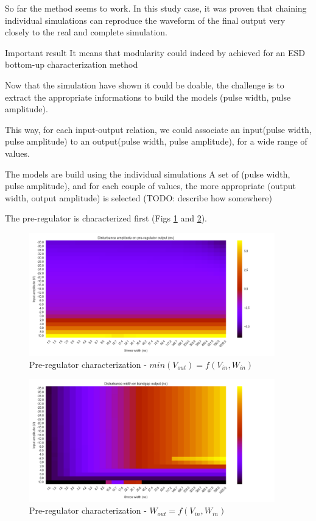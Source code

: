 So far the method seems to work.
In this study case, it was proven that chaining individual simulations can reproduce the waveform of the final output very closely to the real and complete simulation.

Important result
It means that modularity could indeed by achieved for an ESD bottom-up characterization method

Now that the simulation have shown it could be doable, the challenge is to extract the appropriate informations to build the models
(pulse width, pulse amplitude).

This way, for each input-output relation, we could associate an input(pulse width, pulse amplitude) to an output(pulse width, pulse amplitude), for a wide range of values.

The models are build using the individual simulations
A set of (pulse width, pulse amplitude), and for each couple of values, the more appropriate (output width, output amplitude) is selected (TODO: describe how somewhere)

The pre-regulator is characterized first (Figs \ref{fig:pre-reg-cz-v2-amp} and \ref{fig:pre-reg-cz-v2-width}).

\begin{figure}[!h]
  \centering
  \includegraphics[width=0.95\textwidth]{src/4/figures/vpre_cz_V2_amplitude.png}
  \caption{Pre-regulator characterization - $min(V_{out}) = f(V_{in}, W_{in})$}
  \label{fig:pre-reg-cz-v2-amp}
\end{figure}

\begin{figure}[!hp]
  \centering
  \includegraphics[width=0.95\textwidth]{src/4/figures/vpre_cz_V2_width.png}
  \caption{Pre-regulator characterization - $W_{out} = f(V_{in}, W_{in})$}
  \label{fig:pre-reg-cz-v2-width}
\end{figure}

